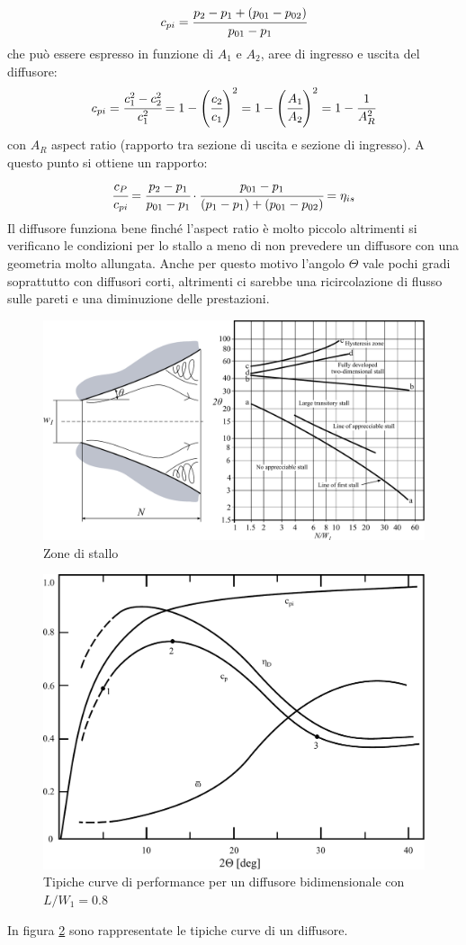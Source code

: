 \begin{align*}
c_{pi} = \cfrac{p_2 - p_1 + (p_{01} - p_{02})}{p_{01} - p_1}
\end{align*}
che può essere espresso in funzione di $A_1$ e $A_2$, aree di ingresso e uscita del diffusore:
\begin{align*}
c_{pi} = \cfrac{c_1^2 - c_2^2}{c_1^2} = 1 - \left( \cfrac{c_2}{c_1}\right)^2 = 1- \left(\cfrac{A_1}{A_2} \right)^2 =1-\cfrac{1}{A_R^2}
\end{align*}
con $A_R$ aspect ratio (rapporto tra sezione di uscita e sezione di ingresso). A questo punto si ottiene un rapporto:
\begin{align*}
\cfrac{c_P}{c_{pi}} = \cfrac{p_2-p_1}{p_{01}-p_1} \cdot \cfrac{p_{01}-p_1}{(p_1-p_1)+(p_{01}-p_{02})}= \eta_{is}
\end{align*}
Il diffusore funziona bene finché l'aspect ratio è molto piccolo altrimenti si verificano le condizioni per lo stallo a meno di non prevedere un diffusore con una geometria molto allungata. Anche per questo motivo l'angolo $\Theta$ vale pochi gradi soprattutto con diffusori corti, altrimenti ci sarebbe una ricircolazione di flusso sulle pareti e una diminuzione delle prestazioni. 
\begin{figure}
\centering
  \includegraphics[width=.7\textwidth]{fig/stallo.pdf}
\caption{Zone di stallo}
\label{fig:stallo}
\end{figure}
\begin{figure}
\centering
  \includegraphics[width=.5\textwidth]{fig/DiffPerf.pdf}
\caption{Tipiche curve di performance per un diffusore bidimensionale con $L/W_1 = 0.8$}
\label{fig:DiffPerf}
\end{figure}
In figura \ref{fig:DiffPerf} sono rappresentate le tipiche curve di un diffusore.
